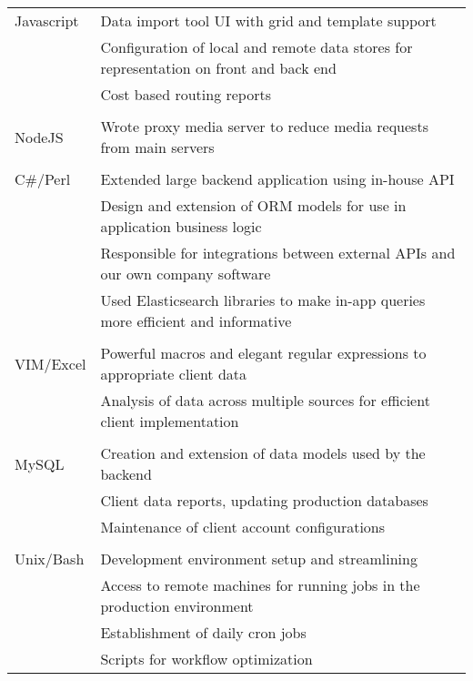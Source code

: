 \documentclass{article}
\begin{document}
\begin{description}
\begin{description}
                \begin{tabular}{l|l}
                    Javascript & Data import tool UI with grid and template support \\
                               & Configuration of local and remote data stores for representation on front and back end\\
                               & Cost based routing reports \\
                                 \\
                    NodeJS     & Wrote proxy media server to reduce media requests from main servers \\
                                 \\
                    C\#/Perl   & Extended large backend application using in-house API \\
                               & Design and extension of ORM models for use in application business logic \\
                               & Responsible for integrations between external APIs and our own company software \\
                               & Used Elasticsearch libraries to make in-app queries more efficient and informative\\
                                 \\
                    VIM/Excel  & Powerful macros and elegant regular expressions to appropriate client data\\
                               & Analysis of data across multiple sources for efficient client implementation\\
                                 \\
                    MySQL      & Creation and extension of data models used by the backend\\
                               & Client data reports, updating production databases\\
                               & Maintenance of client account configurations\\
                                 \\
                    Unix/Bash  & Development environment setup and streamlining\\
                               & Access to remote machines for running jobs in the production environment\\
                               & Establishment of daily cron jobs\\
                               & Scripts for workflow optimization\\
                \end{tabular}


\end{description}
\end{description}
\end{document}
